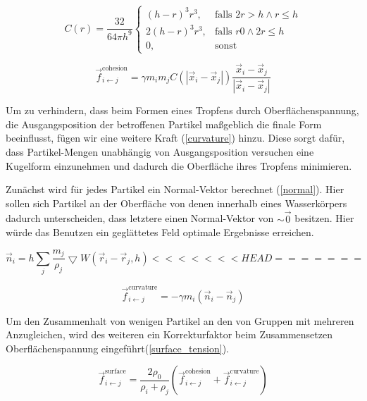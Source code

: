 \documentclass[a4paper]{paper}
\begin{document}
\begin{equation}
\label{spline}
C(r) = \frac{32}{64 \pi h^9}
\begin{cases}
(h-r)^3r^3,  &\text{falls }  2r > h \land r \leq h\\
2(h-r)^3r^3, &\text{falls } r  0 \land 2r \leq h\\
0,&\text{sonst}  
\end{cases}
\end{equation}



\begin{equation}
\label{cohesion}
\vec{f}_{i\leftarrow j}^{\text{cohesion}} = \gamma m_{i} m_{j} C(|\vec{x}_i - \vec{x}_j|)\frac{\vec{x}_i - \vec{x}_j}{|\vec{x}_i - \vec{x}_j|}
\end{equation}


Um zu verhindern, dass beim Formen eines Tropfens durch Oberflächenspannung, die Ausgangsposition der betroffenen Partikel maßgeblich die finale Form beeinflusst, fügen wir eine weitere Kraft (\ref{curvature}) hinzu.
Diese sorgt dafür, dass Partikel-Mengen unabhängig von Ausgangsposition versuchen eine Kugelform einzunehmen und dadurch die Oberfläche ihres Tropfens minimieren.

Zunächst wird für jedes Partikel ein Normal-Vektor berechnet (\ref{normal}). Hier sollen sich Partikel an der Oberfläche von denen innerhalb eines Wasserkörpers dadurch unterscheiden, dass letztere einen Normal-Vektor von $\sim \vec{0}$ besitzen. Hier würde das Benutzen ein geglättetes Feld optimale Ergebnisse erreichen.

\begin{equation}
\label{normal}
\vec{n}_{i} = h\sum_{j}\frac{m_{j}}{\rho_{j}}\bigtriangledown W (\vec{r}_{i}-\vec{r}_{j},h)
<<<<<<< HEAD
=======
\end{equation}

\begin{equation}
\label{curvature}
\vec{f}_{i\leftarrow j}^{\text{curvature}} = -\gamma m_{i}(\vec{n}_i - \vec{n}_j)
\end{equation}

Um den Zusammenhalt von wenigen Partikel an den von Gruppen mit mehreren Anzugleichen, wird des weiteren ein Korrekturfaktor beim Zusammensetzen Oberflächenspannung eingeführt(\ref{surface_tension}).

\begin{equation}
	\label{surface_tension}
	\vec{f}_{i\leftarrow j}^{\text{surface}} = \frac{2\rho_{0}}{\rho_{i}+\rho_{j}} (\vec{f}_{i\leftarrow j}^{\text{cohesion}} + \vec{f}_{i\leftarrow j}^{\text{curvature}})
\end{equation}
\end{document}
